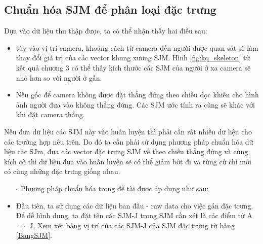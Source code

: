 \newpage

\subsection{Chuẩn hóa SJM để phân loại đặc trưng}

Dựa vào dữ liệu thu thập được, ta có thể nhận thấy hai điều sau:
\begin{itemize}
\item tùy vào vị trí camera, khoảng cách từ camera đến người được quan sát sẽ làm thay đổi giá trị của các vector khung xương SJM. Hình \ref{fig:kq_skeleton} từ kết quả chương 3 có thể thấy kích thước các SJM của người ở xa camera sẽ nhỏ hơn so với người ở gần.
\item Nếu góc để camera không được đặt thẳng đứng theo chiều dọc khiến cho hình ảnh người đưa vào không thẳng đứng. Các SJM ước tính ra cũng sẽ khác với khi đặt camera thẳng.
\end{itemize}

Nếu đưa dữ liệu các SJM này vào huấn luyện thì phải cần rất nhiều dữ liệu cho các trường hợp nêu trên. Do đó ta cần phải sử dụng phương pháp chuẩn hóa dữ liệu các SJm, đưa các vector đặc trưng SJM về theo chiều thẳng đứng và cùng kích cỡ thì dữ liệu đưa vào huấn luyện sẽ có thể giảm bớt đi và từng cử chỉ mới có cùng những đặc trưng giống nhau.

\begin{itemize}
\item[$\square$] Phương pháp chuẩn hóa trong đề tài được áp dụng như sau:
\end{itemize}
\begin{itemize}
\item Đầu tiên, ta sử dụng các dữ liệu ban đầu - raw data cho việc gán đặc trưng. Để dễ hình dung, ta đặt tên các SJM-J trong SJM cần xét là các điểm từ A $\Rightarrow$ J. Xem xét bảng vị trí của các SJM-J của SJM đặc trưng từ bảng \ref{BangSJM}.
\end{itemize}

